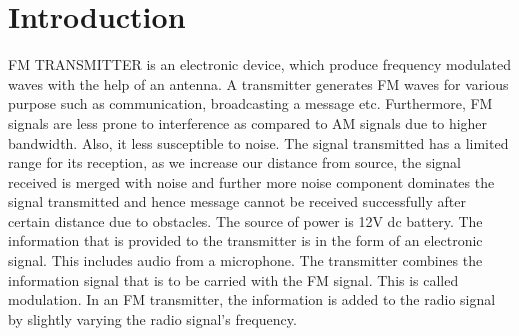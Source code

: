 \chapter{Introduction}
\begin{flushleft}
FM TRANSMITTER is an electronic device, which produce frequency modulated waves with
the help of an antenna. A transmitter generates FM waves for various purpose such as
communication, broadcasting a message etc. Furthermore, FM signals are less prone to
interference as compared to AM signals due to higher bandwidth. Also, it less susceptible to
noise. The signal transmitted has a limited range for its reception, as we increase our
distance from source, the signal received is merged with noise and further more noise
component dominates the signal transmitted and hence message cannot be received
successfully after certain distance due to obstacles. The source of power is 12V dc battery.
The information that is provided to the transmitter is in the form of an electronic signal. This
includes audio from a microphone. The transmitter combines the information signal that is
to be carried with the FM signal. This is called modulation. In an FM transmitter, the
information is added to the radio signal by slightly varying the radio signal’s frequency.

\end{flushleft}